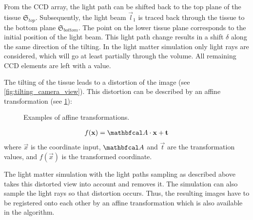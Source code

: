 From the \ac{CCD} array, the light path can be shifted back to the top plane of the tissue $\mathfrak{S}_{top}$.
Subsequently, the light beam $\vec{l}_1$ is traced back through the tissue to the bottom plane $\mathfrak{S}_{bottom}$.
The point on the lower tissue plane corresponds to the initial position of the light beam.
This light path change results in a shift $\delta$ along the same direction of the tilting.
In the light matter simulation only light rays are considered, which will go at least partially through the volume.
All remaining \ac{CCD} elements are left with a  value.
\par
%
The tilting of the tissue leads to a distortion of the image (see \cref{fig:tilting_camera_view}).
This distortion can be described by an affine transformation (see \cref{fig::affine_transformation}):
%
\begin{figure}[!t]
\centering

\caption{Examples of affine transformations.}
\label{fig::affine_transformation}
\end{figure}
%
\begin{align}
f(\vec{x}) = \mat{A} \cdot \vec{x} + \vec{t}
\end{align}
where $\vec{x}$ is the coordinate input, $\mat{A}$ and $\vec{t}$ are the transformation values, and $f(\vec{x})$ is the transformed coordinate.
\par
%
The light matter simulation with the light paths sampling as described above takes this distorted view into account and removes it.
The simulation can also sample the light rays so that distortion occurs.
Thus, the resulting images have to be registered onto each other by an affine transformation which is also available in the algorithm.
% 
% 
% 
